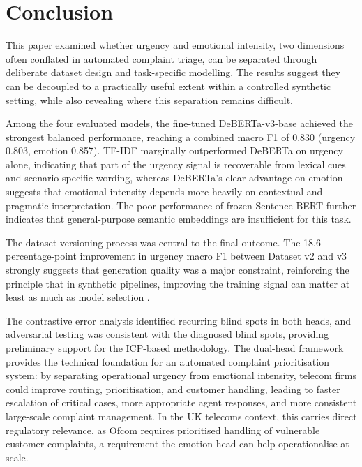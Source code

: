 \documentclass[11pt]{article}
\begin{document}
\section{Conclusion}

This paper examined whether urgency and emotional intensity, two dimensions often
conflated in automated complaint triage, can be separated through deliberate dataset
design and task-specific modelling. The results suggest they can be decoupled to a
practically useful extent within a controlled synthetic setting, while also revealing
where this separation remains difficult.

Among the four evaluated models, the fine-tuned DeBERTa-v3-base achieved the strongest
balanced performance, reaching a combined macro F1 of 0.830 (urgency 0.803, emotion
0.857). TF-IDF marginally outperformed DeBERTa on urgency alone, indicating that part
of the urgency signal is recoverable from lexical cues and scenario-specific wording,
whereas DeBERTa's clear advantage on emotion suggests that emotional intensity depends
more heavily on contextual and pragmatic interpretation. The poor performance of frozen
Sentence-BERT further indicates that general-purpose semantic embeddings are
insufficient for this task.

The dataset versioning process was central to the final outcome. The 18.6
percentage-point improvement in urgency macro F1 between Dataset v2 and v3 strongly
suggests that generation quality was a major constraint, reinforcing the principle that
in synthetic pipelines, improving the training signal can matter at least as much as
model selection \citep{iskander2024quality}.

The contrastive error analysis identified recurring blind spots in both heads, and
adversarial testing was consistent with the diagnosed blind spots, providing preliminary
support for the ICP-based methodology. The dual-head framework provides the technical
foundation for an automated complaint prioritisation system: by separating operational
urgency from emotional intensity, telecom firms could improve routing, prioritisation,
and customer handling, leading to faster escalation of critical cases, more appropriate
agent responses, and more consistent large-scale complaint management. In the UK telecoms
context, this carries direct regulatory relevance, as Ofcom requires prioritised handling
of vulnerable customer complaints, a requirement the emotion head can help operationalise
at scale.
\end{document}
